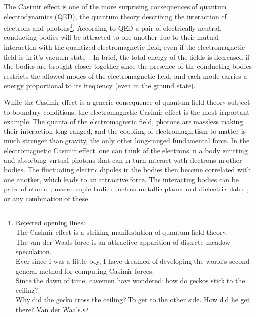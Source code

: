 
The Casimir effect is one of the more surprising consequences of quantum electrodynamics (QED), the quantum theory
describing the interaction of electrons and photons\footnote{
Rejected opening lines: \\
The Casimir effect is a striking manifestation of quantum field theory.\\
The van der Waals force is an attractive apparition of discrete meadow speculation.\\
Ever since I was a little boy, I have dreamed of developing the world's second general method for
computing Casimir forces.\\
Since the dawn of time, cavemen have wondered: how do geckos stick to the ceiling?\\
Why did the gecko cross the ceiling?  To get to the other side.  How did he get there?  Van der Waals.
}.
According to QED a pair of  electrically neutral, conducting bodies will be attracted to one another due to their mutual interaction
with the quantized electromagnetic field, even if the electromagnetic field is in it's vacuum state~\cite{Casimir1948}.  
In brief, the total energy of the fields is decreased if the bodies are brought closer together 
since the presence of the conducting bodies restricts the allowed modes of the electromagnetic field,
and each mode carries a energy proportional to its frequency (even in the ground state).

While the Casimir effect is a generic consequence of quantum field theory subject to boundary conditions,
the electromagnetic Casimir effect is the most important example.  
The quanta of the electromagnetic field, photons are massless making their interaction long-ranged, 
and the coupling of electromagnetism to matter is much stronger than gravity, the only other long-ranged fundamental force.  
In the electromagnetic Casimir effect, one can think of the electrons in a body emitting and absorbing virtual photons that can in turn
interact with electrons in other bodies.  The fluctuating electric dipoles in the bodies then become correlated with one
another, which leads to an attractive force.
The interacting bodies can be pairs of atoms~\cite{CasimirPolder1948}, 
macroscopic bodies such as metallic planes and dielectric slabs~\cite{Lifshitz1956}, or any combination of these.

